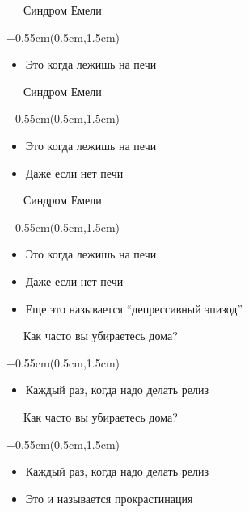 \documentclass[xetex,18pt,aspectratio=169]{beamer}
\begin{document}
\begin{Large}
\begin{frame}{\ \ \ Синдром Емели}
\begin{textblock*}{\framewidth+0.55cm}(0.5cm,1.5cm)
\begin{itemize}
  \item Это когда лежишь на печи
\end{itemize}
\end{textblock*}
\end{frame}

\begin{frame}{\ \ \ Синдром Емели}
\begin{textblock*}{\framewidth+0.55cm}(0.5cm,1.5cm)
\begin{itemize}
  \item Это когда лежишь на печи
  \item Даже если нет печи
\end{itemize}
\end{textblock*}
\end{frame}

\begin{frame}{\ \ \ Синдром Емели}
\begin{textblock*}{\framewidth+0.55cm}(0.5cm,1.5cm)
\begin{itemize}
  \item Это когда лежишь на печи
  \item Даже если нет печи
  \item Еще это называется ``депрессивный эпизод''
\end{itemize}
\end{textblock*}
\end{frame}

\begin{frame}{\ \ \ Как часто вы убираетесь дома?}
\begin{textblock*}{\framewidth+0.55cm}(0.5cm,1.5cm)
\begin{itemize}
  \item Каждый раз, когда надо делать релиз
\end{itemize}
\end{textblock*}
\end{frame}

\begin{frame}{\ \ \ Как часто вы убираетесь дома?}
\begin{textblock*}{\framewidth+0.55cm}(0.5cm,1.5cm)
\begin{itemize}
  \item Каждый раз, когда надо делать релиз
  \item Это и называется прокрастинация
\end{itemize}
\end{textblock*}
\end{frame}


\end{Large}
\end{document}
